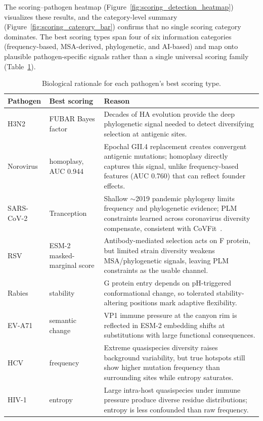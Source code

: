 The scoring--pathogen heatmap (Figure~\ref{fig:scoring_detection_heatmap}) visualizes these results, and the category-level summary (Figure~\ref{fig:scoring_category_bar}) confirms that no single scoring category dominates.
The best scoring types span four of six information categories (frequency-based, MSA-derived, phylogenetic, and AI-based) and map onto plausible pathogen-specific signals rather than a single universal scoring family (Table~\ref{tab:stage2_biology_rationales}).

\begin{table}[htbp]
\centering
\small
\caption{Biological rationale for each pathogen's best scoring type.}
\label{tab:stage2_biology_rationales}
\begin{tabular}{p{}p{}p{}}
\toprule
Pathogen & Best scoring & Reason \\
\midrule
H3N2 & FUBAR Bayes factor & Decades of HA evolution provide the deep phylogenetic signal needed to detect diversifying selection at antigenic sites. \\
Norovirus & homoplasy, AUC 0.944 & Epochal GII.4 replacement creates convergent antigenic mutations; homoplasy directly captures this signal, unlike frequency-based features (AUC 0.760) that can reflect founder effects. \\
SARS-CoV-2 & Tranception & Shallow $\sim$2019 pandemic phylogeny limits frequency and phylogenetic evidence; PLM constraints learned across coronavirus diversity compensate, consistent with CoVFit~\cite{covfit2025}. \\
RSV & ESM-2 masked-marginal score & Antibody-mediated selection acts on F protein, but limited strain diversity weakens MSA/phylogenetic signals, leaving PLM constraints as the usable channel. \\
Rabies & stability & G protein entry depends on pH-triggered conformational change, so tolerated stability-altering positions mark adaptive flexibility. \\
EV-A71 & semantic change & VP1 immune pressure at the canyon rim is reflected in ESM-2 embedding shifts at substitutions with large functional consequences. \\
HCV & frequency & Extreme quasispecies diversity raises background variability, but true hotspots still show higher mutation frequency than surrounding sites while entropy saturates. \\
HIV-1 & entropy & Large intra-host quasispecies under immune pressure produce diverse residue distributions; entropy is less confounded than raw frequency. \\

\end{tabular}
\end{table}
